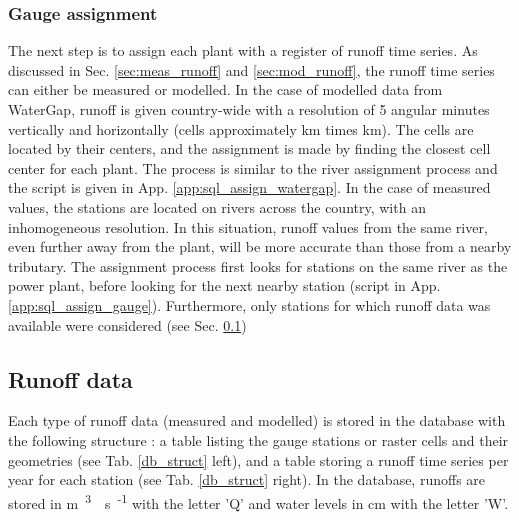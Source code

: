 \subsubsection*{Gauge assignment}
The next step is to assign each plant with a register of runoff time series. As discussed in Sec. \ref{sec:meas_runoff} and \ref{sec:mod_runoff}, the runoff time series can either be measured or modelled. \newline
In the case of modelled data from WaterGap, runoff is given country-wide with a resolution of 5 angular minutes vertically and horizontally (cells approximately \unit[9]{km} times \unit[6]{km}). The cells are located by their centers, and the assignment is made by finding the closest cell center for each plant. The process is similar to the river assignment process and the script is given in App. \ref{app:sql_assign_watergap}. \newline
In the case of measured values, the stations are located on rivers across the country, with an inhomogeneous resolution. In this situation, runoff values from the same river, even further away from the plant, will be more accurate than those from a nearby tributary. The assignment process first looks for stations on the same river as the power plant, before looking for the next nearby station (script in App. \ref{app:sql_assign_gauge}). Furthermore, only stations for which runoff data was available were considered (see Sec. \ref{sec:runoff_data})

\subsection{Runoff data}
\label{sec:runoff_data}

Each type of runoff data (measured and modelled) is stored in the database with the following structure : a table listing the gauge stations or raster cells and their geometries (see Tab. \ref{db_struct} left), and a table storing a runoff time series per year for each station (see Tab. \ref{db_struct} right). In the database, runoffs are stored in \unit{m\textsuperscript{3}\textperiodcentered s\textsuperscript{-1}} with the letter 'Q' and water levels in \unit{cm} with the letter 'W'.

